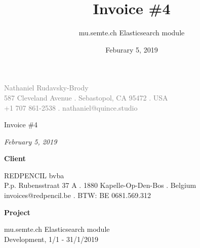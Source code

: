 \documentclass[11pt]{article}
\author{mu.semte.ch Elasticsearch module}
\date{Feburary 5, 2019}
\title{Invoice \#4}
\begin{document}
 \thispagestyle{empty}
\centering

{\small\textcolor{gray}{
Nathaniel Rudavsky-Brody \\
587 Cleveland Avenue . Sebastopol, CA 95472 . USA\\
+1 707 861-2538  . nathaniel@quince.studio\\
}}

\vspace{4em}

{\Huge Invoice \#4	}

\vspace{1em}

{\textit{February 5, 2019}}

\vspace{1em}

{\Large\textbf{Client}}

REDPENCIL bvba\\
P.p. Rubensstraat 37 A . 1880 Kapelle-Op-Den-Bos . Belgium\\
invoices@redpencil.be . BTW: BE 0681.569.312

\vspace{1em}

{\Large\textbf{Project}}

 mu.semte.ch Elasticsearch module\\
 Development, 1/1 - 31/1/2019

\vspace{1em}
\end{document}
